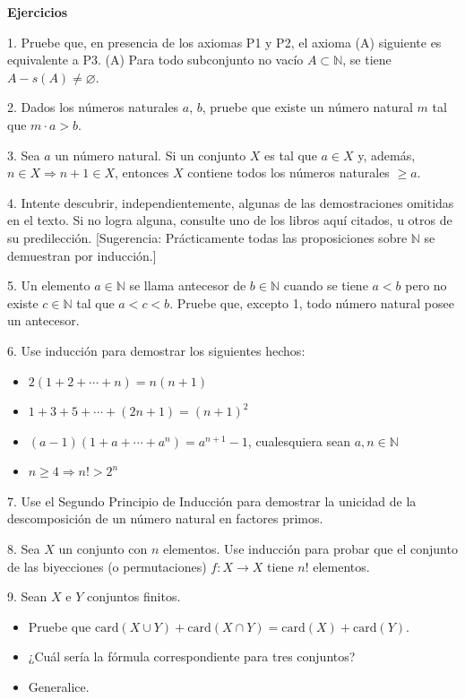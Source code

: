 \documentclass[12pt,oneside]{book}
\begin{document}
\textbf{Ejercicios}

1. Pruebe que, en presencia de los axiomas P1 y P2, el axioma (A) siguiente es equivalente a P3. (A) Para todo subconjunto no vacío \( A \subset \mathbb{N} \), se tiene \( A - s(A) \neq \varnothing \).

2. Dados los números naturales \( a \), \( b \), pruebe que existe un número natural \( m \) tal que \( m \cdot a > b \).

3. Sea \( a \) un número natural. Si un conjunto \( X \) es tal que \( a \in X \) y, además, \( n \in X \Rightarrow n + 1 \in X \), entonces \( X \) contiene todos los números naturales \( \geq a \).

4. Intente descubrir, independientemente, algunas de las demostraciones omitidas en el texto. Si no logra alguna, consulte uno de los libros aquí citados, u otros de su predilección. [Sugerencia: Prácticamente todas las proposiciones sobre \( \mathbb{N} \) se demuestran por inducción.]

5. Un elemento \( a \in \mathbb{N} \) se llama antecesor de \( b \in \mathbb{N} \) cuando se tiene \( a < b \) pero no existe \( c \in \mathbb{N} \) tal que \( a < c < b \). Pruebe que, excepto 1, todo número natural posee un antecesor.

6. Use inducción para demostrar los siguientes hechos:

\begin{itemize}
    \item[a)] \( 2(1 + 2 + \cdots + n) = n(n+1) \)
    \item[b)] \( 1 + 3 + 5 + \cdots + (2n+1) = (n+1)^2 \)
    \item[c)] \( (a-1)(1 + a + \cdots + a^n) = a^{n+1} - 1 \), cualesquiera sean \( a, n \in \mathbb{N} \)
    \item[d)] \( n \geq 4 \Rightarrow n! > 2^n \)
\end{itemize}

7. Use el Segundo Principio de Inducción para demostrar la unicidad de la descomposición de un número natural en factores primos.

8. Sea \( X \) un conjunto con \( n \) elementos. Use inducción para probar que el conjunto de las biyecciones (o permutaciones) \( f: X \to X \) tiene \( n! \) elementos.

9. Sean \( X \) e \( Y \) conjuntos finitos.

\begin{itemize}
    \item[a)] Pruebe que \( \text{card}(X \cup Y) + \text{card}(X \cap Y) = \text{card}(X) + \text{card}(Y) \).
    \item[b)] ¿Cuál sería la fórmula correspondiente para tres conjuntos?
    \item[c)] Generalice.
\end{itemize}
\end{document}
